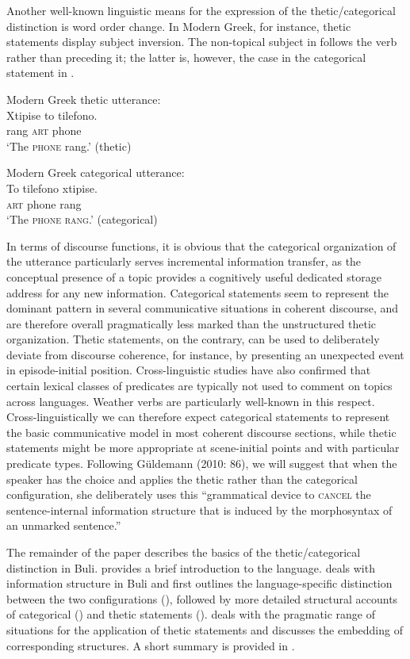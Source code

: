 \documentclass[output=paper]{langsci/langscibook}
\begin{document}
Another well-known linguistic means for the expression of the thetic/categorical distinction is word order change. In Modern Greek, for instance, thetic statements display subject inversion. The non-topical subject in  follows the verb rather than preceding it; the latter is, however, the case in the categorical statement in .

\ea
{ Modern Greek   thetic utterance:}\\
\gll Xtipise    to    tilefono. \\
     rang    \textsc{art}    phone\\
\glt ‘The \textsc{phone} rang.’ (thetic)
\z

\ea
{ Modern Greek   categorical utterance:}\\
\gll To     tilefono   xtipise.\\
     \textsc{art}    phone     rang\\
\glt ‘The \textsc{phone rang}.’ (categorical) \citep[536]{Sasse1987}
\z

In terms of discourse functions, it is obvious that the categorical organization of the utterance particularly serves incremental information transfer, as the conceptual presence of a topic provides a cognitively useful dedicated storage address for any new information. Categorical statements seem to represent the dominant pattern in several communicative situations in coherent discourse, and are therefore overall pragmatically less marked than the unstructured thetic organization. Thetic statements, on the contrary, can be used to deliberately deviate from discourse coherence, for instance, by presenting an unexpected event in episode-initial position. Cross-linguistic studies \citep{Sasse1995} have also confirmed that certain lexical classes of predicates are typically not used to comment on topics across languages. Weather verbs are particularly well-known in this respect. Cross-linguistically we can therefore expect categorical statements to represent the basic communicative model in most coherent discourse sections, while thetic statements might be more appropriate at scene-initial points and with particular predicate types. Following Güldemann (2010: 86), we will suggest that when the speaker has the choice and applies the thetic rather than the categorical configuration, she deliberately uses this “grammatical device to \textsc{cancel} the sentence-internal information structure that is induced by the morphosyntax of an unmarked sentence.”

The remainder of the paper describes the basics of the thetic/categorical distinction in Buli.  provides a brief introduction to the language.  deals with information structure in Buli and first outlines the language-specific distinction between the two configurations (), followed by more detailed structural accounts of categorical () and thetic statements ().  deals with the pragmatic range of situations for the application of thetic statements and  discusses the embedding of corresponding structures. A short summary is provided in .
\end{document}

